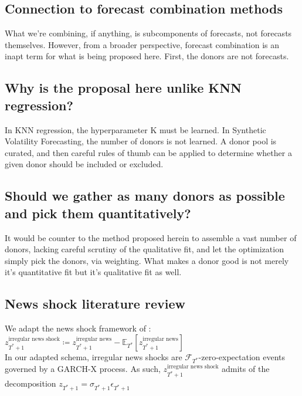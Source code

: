 \documentclass[11pt]{article}
\def\E{\mathbb{E}} %
\theoremstyle{definition}
\begin{document}
\subsection{Connection to forecast combination methods}
What we're combining, if anything, is subcomponents of forecasts, not forecasts themselves.  However, from a broader perspective, forecast combination is an inapt term for what is being proposed here.  First, the donors are not forecasts. 

\subsection{Why is the proposal here unlike KNN regression?}
In KNN regression, the hyperparameter K must be learned.  In Synthetic Volatility Forecasting, the number of donors is not learned.  A donor pool is curated, and then careful rules of thumb can be applied to determine whether a given donor should be included or excluded. 

\subsection{Should we gather as many donors as possible and pick them quantitatively?}
It would be counter to the method proposed herein to assemble a vast number of donors, lacking careful scrutiny of the qualitative fit, and let the optimization simply pick the donors, via weighting.  What makes a donor good is not merely it's quantitative fit but it's qualitative fit as well.

\subsection{News shock literature review}

We adapt the news shock framework of \citet{kilian2017structural}: \\

$z_{T^{*}+1}^{\text{irregular news shock}} \coloneqq z_{T^{*}+1}^{\text{irregular news}} - \E_{T^{*}}[z_{T^{*}+1}^{\text{irregular news}}]$ \\

In our adapted schema, irregular news shocks are $\mathcal{F}_{T^{*}}$-zero-expectation events governed by a GARCH-X process.  As such, $z_{T^{*}+1}^{\text{irregular news shock}}$ admits of the decomposition $z_{T^{*}+1} = \sigma_{T^{*}+1}\epsilon_{T^{*}+1}$
\end{document}
